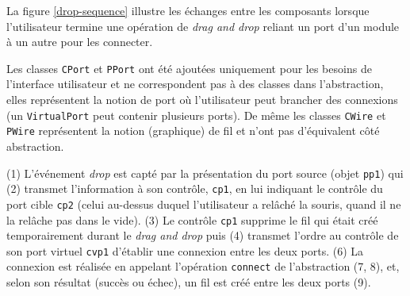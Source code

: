 La figure \ref{drop-sequence} illustre les échanges entre les composants lorsque
l'utilisateur termine une opération de \emph{drag and drop} reliant
un port d'un module à un autre pour les connecter.

Les classes \verb!CPort! et \verb!PPort! ont été ajoutées
uniquement pour les besoins de l'interface utilisateur et ne
correspondent pas à des classes dans l'abstraction, elles
représentent la notion de port où l'utilisateur peut brancher des
connexions (un \verb!VirtualPort! peut contenir plusieurs ports).
De même les classes \verb!CWire! et \verb!PWire! représentent la
notion (graphique) de fil et n'ont pas d'équivalent côté abstraction.

(1) L'événement \emph{drop} est capté par la présentation du port
source (objet \verb!pp1!) qui (2) transmet l'information à son
contrôle, \verb!cp1!, en lui indiquant le contrôle du port cible
\verb!cp2! (celui au-dessus duquel l'utilisateur a relâché la
souris, quand il ne la relâche pas dans le vide). (3) Le contrôle
\verb!cp1! supprime le fil qui était créé temporairement durant le
\emph{drag and drop} puis (4) transmet l'ordre au contrôle de son port
virtuel \verb!cvp1! d'établir une connexion entre les deux ports.
(6) La connexion est réalisée en appelant l'opération \verb!connect! de
l'abstraction (7, 8), et, selon son résultat (succès ou échec), un fil est
créé entre les deux ports (9).